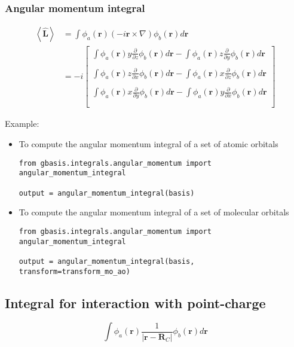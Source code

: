 \documentclass[letterpaper]{article}
\begin{document}
\subsubsection{Angular momentum integral}
\begin{equation}
  \label{eq:angular_momentum}
  \begin{split}
    \left< \hat{\mathbf{L}} \right>
    &= \int \phi_a(\mathbf{r}) \left( -i \mathbf{r} \times \nabla \right) \phi_b(\mathbf{r}) d\mathbf{r}\\
    &= -i
    \begin{bmatrix}
      \int \phi_a(\mathbf{r}) y\frac{\partial}{\partial z} \phi_b(\mathbf{r}) d\mathbf{r}
      - \int \phi_a(\mathbf{r}) z\frac{\partial}{\partial y} \phi_b(\mathbf{r}) d\mathbf{r}\\\\
      \int \phi_a(\mathbf{r}) z\frac{\partial}{\partial x} \phi_b(\mathbf{r}) d\mathbf{r}
      - \int \phi_a(\mathbf{r}) x\frac{\partial}{\partial z} \phi_b(\mathbf{r}) d\mathbf{r}\\\\
      \int \phi_a(\mathbf{r}) x\frac{\partial}{\partial y} \phi_b(\mathbf{r}) d\mathbf{r}
      - \int \phi_a(\mathbf{r}) y\frac{\partial}{\partial x} \phi_b(\mathbf{r}) d\mathbf{r}\\\\
    \end{bmatrix}
  \end{split}
\end{equation}

Example:
\begin{itemize}
\item To compute the angular momentum integral of a set of atomic orbitals
  \begin{lstlisting}[xleftmargin=-25pt]
from gbasis.integrals.angular_momentum import angular_momentum_integral

output = angular_momentum_integral(basis)
\end{lstlisting}
\item To compute the angular momentum integral of a set of molecular orbitals
  \begin{lstlisting}[xleftmargin=-25pt]
from gbasis.integrals.angular_momentum import angular_momentum_integral

output = angular_momentum_integral(basis, transform=transform_mo_ao)
\end{lstlisting}
\end{itemize}
\subsection{Integral for interaction with point-charge}
\begin{equation}
  \label{eq:point_charge}
  \int \phi_a(\mathbf{r}) \frac{1}{|\mathbf{r} - \mathbf{R}_C|} \phi_b(\mathbf{r}) d\mathbf{r}
\end{equation}
\end{document}
